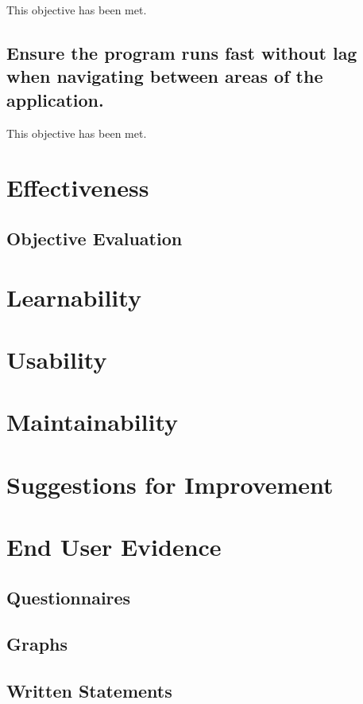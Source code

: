 This objective has been met.

\subsection {Ensure the program runs fast without lag when navigating between areas of the application.}  %

This objective has been met.



\section{Effectiveness}

\subsection{Objective Evaluation}

\section{Learnability}

\section{Usability}

\section{Maintainability}

\section{Suggestions for Improvement}

\section{End User Evidence}

\subsection{Questionnaires}

\subsection{Graphs}

\subsection{Written Statements}
